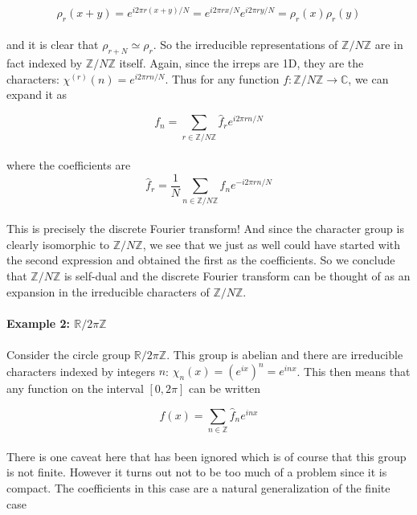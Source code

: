 \documentclass[9 pt]{report}
\begin{document}
$$ \rho_r(x+y)=e^{i2\pi r(x+y)/N} = e^{i2\pi rx/N}e^{i2\pi ry/N} = \rho_r(x)\rho_r(y) $$
\\
and it is clear that $\rho_{r+N}\simeq \rho_r$. So the irreducible representations of $\mathbb{Z}/N\mathbb{Z}$ are in fact indexed by $\mathbb{Z}/N\mathbb{Z}$ itself. Again, since the irreps are 1D, they are the characters: $\chi^{(r)}(n)=e^{i2\pi rn/N}$. Thus for any function $f:\mathbb{Z}/N\mathbb{Z} \to \mathbb{C}$, we can expand it as

$$ f_n = \sum_{r\in \mathbb{Z}/N\mathbb{Z}} \hat{f}_r e^{i2\pi r n/N} $$
\\
where the coefficients are 
$$ \hat{f}_r =\frac{1}{N} \sum_{n\in \mathbb{Z}/N\mathbb{Z}} f_n e^{-i2\pi r n/N} $$
\\
This is precisely the discrete Fourier transform! And since the character group is clearly isomorphic to $ \mathbb{Z}/N\mathbb{Z}$, we see that we just as well could have started with the second expression and obtained the first as the coefficients. So we conclude that $\mathbb{Z}/N\mathbb{Z}$ is self-dual and the discrete Fourier transform can be thought of as an expansion in the irreducible characters of $\mathbb{Z}/N\mathbb{Z}$.
\\
\\

\textbf{Example 2: $\mathbb{R}/2\pi\mathbb{Z}$}
\\
\\
Consider the circle group $\mathbb{R}/2\pi\mathbb{Z}$. This group is abelian and there are irreducible characters indexed by integers $n$: $\chi_n(x)=(e^{ix})^n=e^{i n x}$. This then means that any function on the interval $[0, 2\pi]$ can be written

$$ f(x) = \sum_{n\in \mathbb{Z}} \hat{f}_n e^{in x} $$
\\
There is one caveat here that has been ignored which is of course that this group is not finite. However it turns out not to be too much of a problem since it is compact. The coefficients in this case are a natural generalization of the finite case
\end{document}
